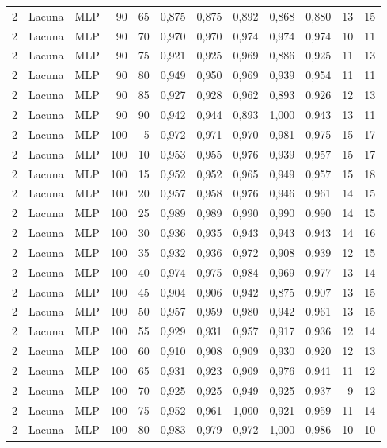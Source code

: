 \begin{longtable}{@{}rllrrrrrrrrr@{}}
2 & Lacuna & MLP & 90 & 65 & 0,875 & 0,875 & 0,892 & 0,868 & 0,880 & 13 & 15 \\
2 & Lacuna & MLP & 90 & 70 & 0,970 & 0,970 & 0,974 & 0,974 & 0,974 & 10 & 11 \\
2 & Lacuna & MLP & 90 & 75 & 0,921 & 0,925 & 0,969 & 0,886 & 0,925 & 11 & 13 \\
2 & Lacuna & MLP & 90 & 80 & 0,949 & 0,950 & 0,969 & 0,939 & 0,954 & 11 & 11 \\
2 & Lacuna & MLP & 90 & 85 & 0,927 & 0,928 & 0,962 & 0,893 & 0,926 & 12 & 13 \\
2 & Lacuna & MLP & 90 & 90 & 0,942 & 0,944 & 0,893 & 1,000 & 0,943 & 13 & 11 \\
2 & Lacuna & MLP & 100 & 5 & 0,972 & 0,971 & 0,970 & 0,981 & 0,975 & 15 & 17 \\
2 & Lacuna & MLP & 100 & 10 & 0,953 & 0,955 & 0,976 & 0,939 & 0,957 & 15 & 17 \\
2 & Lacuna & MLP & 100 & 15 & 0,952 & 0,952 & 0,965 & 0,949 & 0,957 & 15 & 18 \\
2 & Lacuna & MLP & 100 & 20 & 0,957 & 0,958 & 0,976 & 0,946 & 0,961 & 14 & 15 \\
2 & Lacuna & MLP & 100 & 25 & 0,989 & 0,989 & 0,990 & 0,990 & 0,990 & 14 & 15 \\
2 & Lacuna & MLP & 100 & 30 & 0,936 & 0,935 & 0,943 & 0,943 & 0,943 & 14 & 16 \\
2 & Lacuna & MLP & 100 & 35 & 0,932 & 0,936 & 0,972 & 0,908 & 0,939 & 12 & 15 \\
2 & Lacuna & MLP & 100 & 40 & 0,974 & 0,975 & 0,984 & 0,969 & 0,977 & 13 & 14 \\
2 & Lacuna & MLP & 100 & 45 & 0,904 & 0,906 & 0,942 & 0,875 & 0,907 & 13 & 15 \\
2 & Lacuna & MLP & 100 & 50 & 0,957 & 0,959 & 0,980 & 0,942 & 0,961 & 13 & 15 \\
2 & Lacuna & MLP & 100 & 55 & 0,929 & 0,931 & 0,957 & 0,917 & 0,936 & 12 & 14 \\
2 & Lacuna & MLP & 100 & 60 & 0,910 & 0,908 & 0,909 & 0,930 & 0,920 & 12 & 13 \\
2 & Lacuna & MLP & 100 & 65 & 0,931 & 0,923 & 0,909 & 0,976 & 0,941 & 11 & 12 \\
2 & Lacuna & MLP & 100 & 70 & 0,925 & 0,925 & 0,949 & 0,925 & 0,937 & 9 & 12 \\
2 & Lacuna & MLP & 100 & 75 & 0,952 & 0,961 & 1,000 & 0,921 & 0,959 & 11 & 14 \\
2 & Lacuna & MLP & 100 & 80 & 0,983 & 0,979 & 0,972 & 1,000 & 0,986 & 10 & 10 \\

\end{longtable}
